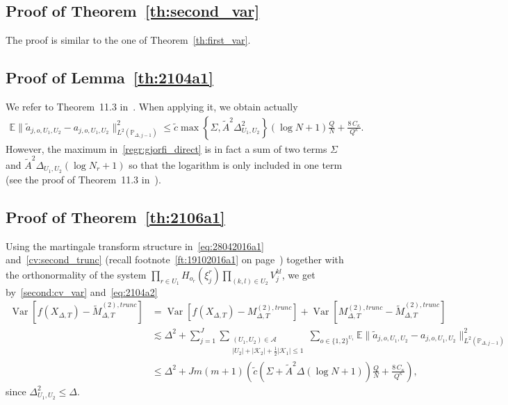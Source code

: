 \documentclass[11pt,a4paper]{amsart}
\theoremstyle{plain}
\theoremstyle{definition}
\theoremstyle{remark}
\numberwithin{equation}{section}
\newcommand*{\E}{\mathbb{E}}
\newcommand*{\Var}{\operatorname{Var}}
\newcommand*{\EE}{\mathbb E}
\newcommand*{\PP}{\mathbb P}
\newcommand*{\cA}{\mathcal A}
\begin{document}
\subsection{Proof of Theorem~\protect\ref{th:second_var}}
The proof is similar to the one of Theorem~\ref{th:first_var}.







\subsection{Proof of Lemma~\protect\ref{th:2104a1}}
We refer to Theorem~11.3 in~\cite{gyorfi2002distribution}. When applying it, we obtain actually
\begin{align}
\label{regr:gjorfi_direct}
\E\|\tilde a_{j,o,U_1,U_2}-a_{j,o,U_1,U_2}\|^2_{L^2(\PP_{\Delta,j-1})}
\le\tilde{c}\max\left\{\Sigma,\tilde A^2\Delta_{U_1,U_2}^2\right\}(\log N+1)\frac{Q}{N}
+\frac{8\,C_\kappa}{Q^\kappa}.
\end{align}
However, the maximum in~\eqref{regr:gjorfi_direct} is in fact a sum of two terms $\Sigma$ and $\tilde A^2\Delta_{U_1,U_2}(\log N_r+1)$ so that the logarithm is only included in one term (see the proof of Theorem~11.3 in~\cite{gyorfi2002distribution}).








\subsection{Proof of Theorem~\protect\ref{th:2106a1}}
Using the martingale transform structure
in~\eqref{eq:28042016a1} and~\eqref{cv:second_trunc}
(recall footnote~\ref{ft:19102016a1}
on page~\pageref{ft:19102016a1}) together with the orthonormality of the system
$\prod_{r\in U_1} H_{o_r}(\xi_j^r)
\prod_{(k,l)\in U_2} V_j^{kl}$, we get by~\eqref{second:cv_var} and~\eqref{eq:2104a2}
\begin{align*}
\Var\left[f(X_{\Delta,T})-
\widetilde M^{(2),trunc}_{\Delta,T}\right]&=\Var\left[f(X_{\Delta,T})-
M^{(2),trunc}_{\Delta,T}\right]+\Var\left[M^{(2),trunc}_{\Delta,T}-
\widetilde M^{(2),trunc}_{\Delta,T}\right]\\
&\lesssim\Delta^2+\sum_{j=1}^J
\sum_{\substack{(U_1,U_2)\in\cA\\ \left|U_2\right|+\left|\mathcal{K}_2\right|+\frac{1}{2}\left|\mathcal{K}_1\right|\le 1}}
\sum_{o\in\{1,2\}^{U_1}}
\EE\|\tilde a_{j,o,U_1,U_2}-a_{j,o,U_1,U_2}\|^2_{L^2(\PP_{\Delta,j-1})}
\\
&\le
\Delta^2+Jm(m+1)\left(\tilde{c}(\Sigma+\tilde A^2\Delta(\log N+1))\frac{Q}{N}
+\frac{8\,C_\kappa}{Q^\kappa}\right),
\end{align*}
since $\Delta_{U_1,U_2}^2\le \Delta$.
\end{document}
